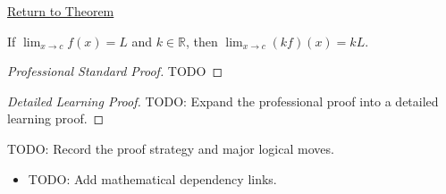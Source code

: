 \newpage
{}
\label{prf:scalar-multiple-rule-function-limits}

\begin{remark*}[Return]
\hyperref[thm:scalar-multiple-rule-function-limits]{Return to Theorem}
\end{remark*}

\begin{theorem*}
If $\lim_{x\to c}f(x)=L$ and $k\in\mathbb{R}$, then $\lim_{x\to c}(kf)(x)=kL$.
\end{theorem*}

\begin{proof}[Professional Standard Proof]
\LRAProofBodyStart
TODO
\end{proof}

\begin{proof}[Detailed Learning Proof]
\LRAProofBodyStart
TODO: Expand the professional proof into a detailed learning proof.
\end{proof}

\begin{remark*}
TODO: Record the proof strategy and major logical moves.
\end{remark*}

\begin{dependencies}
\begin{itemize}
  \item TODO: Add mathematical dependency links.
\end{itemize}
\end{dependencies}
